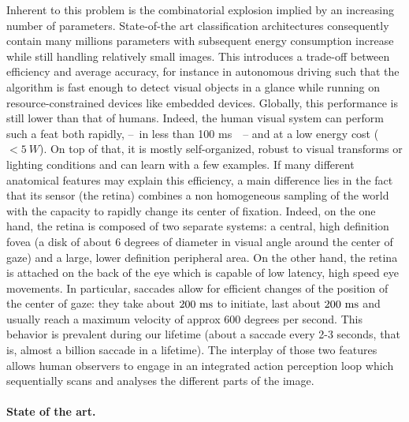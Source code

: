 Inherent to this problem is the combinatorial explosion implied by an increasing number of parameters. State-of-the art classification architectures consequently contain many millions parameters with subsequent energy consumption increase while still handling relatively small images. This introduces a trade-off between efficiency and average accuracy, for instance in autonomous driving such that the algorithm is fast enough to detect visual objects in a glance while running on resource-constrained devices like embedded devices. Globally, this performance is still lower than that of humans. Indeed, the human visual system can perform such a feat both rapidly, --~in less than 100 ms~\citep{Kirchner06}~-- and at a low energy cost ($<5~W$). On top of that, it is mostly self-organized, robust to visual transforms or lighting conditions and can learn with a few examples. If many different anatomical features may explain this efficiency, a main difference lies in the fact that its sensor (the retina) combines a non homogeneous sampling of the world with the capacity to rapidly change its center of fixation. Indeed, on the one hand, the retina is composed of two separate systems: a central, high definition fovea (a disk of about 6 degrees of diameter in visual angle around the center of gaze) and a large, lower definition peripheral area. On the other hand, the retina is attached on the back of the eye which is capable of low latency, high speed eye movements. In particular, saccades allow for efficient changes of the position of the center of gaze: they take about $200~\si{\milli\second}$ to initiate, last about $200~\si{\milli\second}$ and usually reach a maximum velocity of approx 600 degrees per second. This behavior is prevalent during our lifetime (about a saccade every 2-3 seconds, that is, almost a billion saccade in a lifetime). The interplay of those two features allows human observers to engage in an integrated action perception loop which sequentially scans and analyses the different parts of the image.
%
\paragraph{State of the art.}

